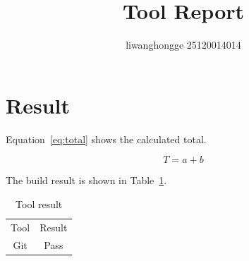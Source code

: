 \documentclass{article}
\begin{document}
\title{Tool Report}
\author{liwanghongge 25120014014}
\maketitle

\section{Result}

Equation~\eqref{eq:total} shows the calculated total.

\begin{equation}
  T = a + b
  \label{eq:total}
\end{equation}

The build result is shown in Table~\ref{tab:result}.

\begin{table}[h]
  \centering
  \caption{Tool result}
  \label{tab:result}

  \begin{tabular}{cc}
    \hline
    Tool & Result \\
    Git  & Pass   \\
    \hline
  \end{tabular}
\end{table}
\end{document}
